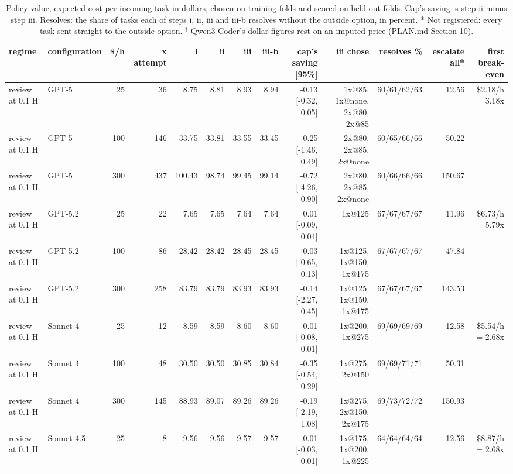 \begin{table}[t]
\centering
\small
\caption{Policy value, expected cost per incoming task in dollars, chosen on training folds and scored on held-out folds. Cap's saving is step ii minus step iii. Resolves: the share of tasks each of steps i, ii, iii and iii-b resolves without the outside option, in percent. * Not registered: every task sent straight to the outside option. $^\dagger$ Qwen3 Coder's dollar figures rest on an imputed price (PLAN.md Section 10).}
\label{tab:tableA10_ladder_review}
\begin{tabular}{llrrrrrrrrrrr}
\toprule
regime & configuration & \$/h & x attempt & i & ii & iii & iii-b & cap's saving [95\%] & iii chose & resolves \% & escalate all* & first break-even \\
\midrule
review at 0.1 H & GPT-5 & 25 & 36 & 8.75 & 8.81 & 8.93 & 8.94 & -0.13 [-0.32, 0.05] & 1x@85, 1x@none, 2x@80, 2x@85 & 60/61/62/63 & 12.56 & \$2.18/h = 3.18x \\
review at 0.1 H & GPT-5 & 100 & 146 & 33.75 & 33.81 & 33.55 & 33.45 & 0.25 [-1.46, 0.49] & 2x@80, 2x@85, 2x@none & 60/65/66/66 & 50.22 &  \\
review at 0.1 H & GPT-5 & 300 & 437 & 100.43 & 98.74 & 99.45 & 99.14 & -0.72 [-4.26, 0.90] & 2x@80, 2x@85, 2x@none & 60/66/66/66 & 150.67 &  \\
review at 0.1 H & GPT-5.2 & 25 & 22 & 7.65 & 7.65 & 7.64 & 7.64 & 0.01 [-0.09, 0.04] & 1x@125 & 67/67/67/67 & 11.96 & \$6.73/h = 5.79x \\
review at 0.1 H & GPT-5.2 & 100 & 86 & 28.42 & 28.42 & 28.45 & 28.45 & -0.03 [-0.65, 0.13] & 1x@125, 1x@150, 1x@175 & 67/67/67/67 & 47.84 &  \\
review at 0.1 H & GPT-5.2 & 300 & 258 & 83.79 & 83.79 & 83.93 & 83.93 & -0.14 [-2.27, 0.45] & 1x@125, 1x@150, 1x@175 & 67/67/67/67 & 143.53 &  \\
review at 0.1 H & Sonnet 4 & 25 & 12 & 8.59 & 8.59 & 8.60 & 8.60 & -0.01 [-0.08, 0.01] & 1x@200, 1x@275 & 69/69/69/69 & 12.58 & \$5.54/h = 2.68x \\
review at 0.1 H & Sonnet 4 & 100 & 48 & 30.50 & 30.50 & 30.85 & 30.84 & -0.35 [-0.54, 0.29] & 1x@275, 2x@150 & 69/69/71/71 & 50.31 &  \\
review at 0.1 H & Sonnet 4 & 300 & 145 & 88.93 & 89.07 & 89.26 & 89.26 & -0.19 [-2.19, 1.08] & 1x@275, 2x@150, 2x@175 & 69/73/72/72 & 150.93 &  \\
review at 0.1 H & Sonnet 4.5 & 25 & 8 & 9.56 & 9.56 & 9.57 & 9.57 & -0.01 [-0.03, 0.01] & 1x@175, 1x@200, 1x@225 & 64/64/64/64 & 12.56 & \$8.87/h = 2.68x \\

\end{tabular}
\end{table}
